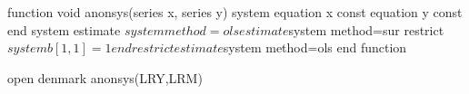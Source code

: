 \begin{code}
function void anonsys(series x, series y)
     system
         equation x const
         equation y const
     end system
     estimate $system method=ols
     estimate $system method=sur
     restrict $system
         b[1,1]=1
     end restrict
     estimate $system method=ols
end function

open denmark
anonsys(LRY,LRM)
\end{code}



